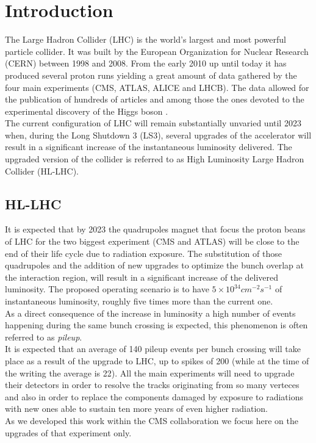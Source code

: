 \chapter{Introduction}\label{ch:intro}
The Large Hadron Collider (LHC) is the world's largest and most powerful particle collider. It was built by the European Organization for Nuclear Research (CERN) between 1998 and 2008. From the early 2010 up until today it has produced several proton runs yielding a great amount of data gathered by the four main experiments (CMS, ATLAS, ALICE and LHCB). The data allowed for the publication of hundreds of articles and among those the ones devoted to the experimental discovery of the Higgs boson \cite{atlasHiggs} \cite{CMSHiggs}.\\ The current configuration of LHC will remain substantially unvaried until 2023 when, during the Long Shutdown 3 (LS3), several upgrades of the accelerator will result in a significant increase of the instantaneous luminosity delivered. The upgraded version of the collider is referred to as High Luminosity Large Hadron Collider (HL-LHC).

\section{HL-LHC}
It is expected that by 2023 the quadrupoles magnet that focus the proton beans of LHC for the two biggest experiment (CMS and ATLAS) will be close to the end of their life cycle due to radiation exposure. The substitution of those quadrupoles and the addition of new upgrades to optimize the bunch overlap at the interaction region, will result in a significant increase of the delivered luminosity.
The proposed operating scenario is to have $5 \times 10^{34} \unit{cm^{-2}s^{-1}}$ of instantaneous luminosity, roughly five times more than the current one.\\
As a direct consequence of the increase in luminosity a high number of events happening during the same bunch crossing is expected, this phenomenon is often referred to as \textit{pileup}.\\
It is expected that an average of 140 pileup events \cite{tdr} per bunch crossing will take place as a result of the upgrade to LHC, up to spikes of 200 (while at the time of the writing the average is 22). All the main experiments will need to upgrade their detectors in order to resolve the tracks originating from so many verteces and also in order to replace the components damaged by exposure to radiations with new ones able to sustain ten more years of even higher radiation.\\
As we developed this work within the CMS collaboration we focus here on the upgrades of that experiment only.

